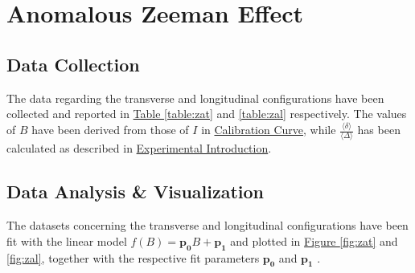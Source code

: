 \documentclass[a4paper,12pt,abstracton]{scrartcl}
\begin{document}
\section{Anomalous Zeeman Effect}

\subsection{Data Collection}

The data regarding the transverse and longitudinal configurations have been collected and reported in \hyperref[table:zat]{Table \ref*{table:zat}} and \hyperref[table:zal]{ \ref*{table:zal}} respectively. The values of $B$ have been derived from those of $I$ in \hyperref[sec:cal]{Calibration Curve}, while $\frac{\langle \delta \rangle}{\langle \Delta \rangle}$ has been calculated as described in \hyperref[sec:ExpIntro]{Experimental Introduction}.

\subsection{Data Analysis \& Visualization}

The datasets concerning the transverse and longitudinal configurations have been fit with the linear model $f(B)=\boldsymbol{p_0}B+\boldsymbol{p_1}$ and plotted in \hyperref[fig:zat]{Figure \ref*{fig:zat}} and \hyperref[fig:zal]{ \ref*{fig:zal}}, together with the respective fit parameters $\boldsymbol{p_0}$ and  $\boldsymbol{p_1}$ .


\begin{table}[H]
\centering
\caption{}
\label{table:zat}
\end{table}
\end{document}
